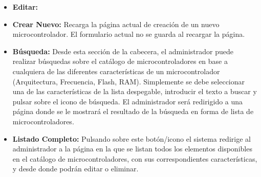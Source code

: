 \begin{itemize}
	\item \textbf{Editar:}
	
	\item \textbf{Crear Nuevo:} Recarga la página actual de creación de un nuevo microcontrolador. El formulario actual no se guarda al recargar la página.

	\item \textbf{Búsqueda:} Desde esta sección de la cabecera, el administrador puede realizar búsquedas sobre el catálogo de microcontroladores en base a cualquiera de las diferentes características de un microcontrolador (Arquitectura, Frecuencia, Flash, RAM). Simplemente se debe seleccionar una de las características de la lista despegable, introducir el texto a buscar y pulsar sobre el icono de búsqueda.
	El administrador será redirigido a una página donde se le mostrará el resultado de la búsqueda en forma de lista de microcontroladores.
			
	\item \textbf{Listado Completo:} Pulsando sobre este botón/icono el sistema redirige al administrador a la página en la que se listan todos los elementos disponibles en el catálogo de microcontroladores, con sus correspondientes características, y desde donde podrán editar o eliminar.
\end{itemize}